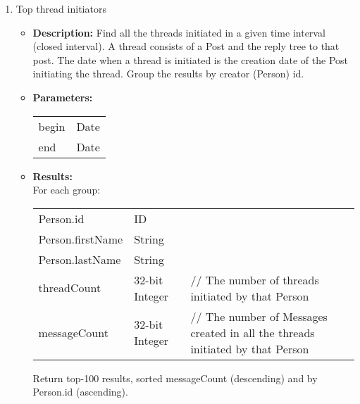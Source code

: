 {\begin{enumerate}
                  \item Top thread initiators 
                    \begin{itemize}
                      \item \textbf{Description:}
                        Find all the threads initiated in a given time interval (closed interval).  A thread consists of
                        a Post and the reply tree to that post. The date when a thread is initiated is the creation date
                        of the Post initiating the thread. Group the results by creator (Person) id.
                      \item \textbf{Parameters:} \\
                        \begin{tabular}{ll}
                          begin & Date \\
                          end & Date \\
                        \end{tabular}
                      \item \textbf{Results:} \\
                        For each group:
                        \begin{tabular}{lll}
                          Person.id & ID & \\
                          Person.firstName & String & \\
                          Person.lastName & String & \\
                          threadCount & 32-bit Integer & \parbox[t]{20cm}{ // The number of threads initiated by that
                            Person \strut} \\
                          messageCount & 32-bit Integer & \parbox[t]{20cm}{ // The number of Messages created in all the
                            threads initiated by that Person \strut} \\
                        \end{tabular}
                        Return top-100 results, sorted messageCount (descending) and by Person.id (ascending).
                    \end{itemize}


\end{enumerate}}
